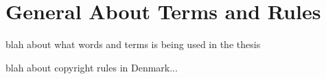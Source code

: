 \chapter{General About Terms and Rules}

blah about what words and terms is being used in the thesis

blah about copyright rules in Denmark...